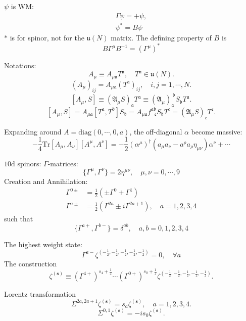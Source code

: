 $\psi$ is WM:
\begin{align}
	\Gamma \psi = + \psi,\\
	\psi^* = B \psi \label{Maj-cond}
\end{align}
$*$ is for spinor, not for the $\mathfrak{u}(N)$ matrix.
The defining property of $B$ is
\begin{equation}
	B \Gamma^\mu B^{-1} = (\Gamma^\mu)^*
\end{equation}

\begin{correct}
	Notations:
	\[
		A_\mu \equiv A_{\mu \mathfrak{a}} T^{\mathfrak{a}},\quad T^{\mathfrak{a}}\in \mathfrak{u}(N)
	.\] 
	\[
		(A_\mu)_{ij} =A_{\mu \mathfrak{a}} (T^{\mathfrak{a}})_{ij},\quad i,j=1,\cdots,N
	.\] 
	\[
		[A_\mu,S] \equiv (\mathfrak{A}_\mu S)_{\mathfrak{a}} T^{\mathfrak{a}}
		\equiv (\mathfrak{A}_\mu)_{\mathfrak{a}}^{~\mathfrak{b}} S_{\mathfrak{b}} T^{\mathfrak{a}}
	.\] 
	\[
		[A_\mu,S] = A_{\mu \mathfrak{a}} 
		[T^{\mathfrak{a}},T^{\mathfrak{b}}]S_{\mathfrak{b}}
		= A_{\mu \mathfrak{a}} f^{\mathfrak{a}\mathfrak{b}}_{~~~\mathfrak{c}}
		S_{\mathfrak{b}} T^{\mathfrak{c}}
		= (\mathfrak{A}_\mu S)_{\mathfrak{c}} T^{\mathfrak{c}}
	.\] 
\end{correct}

Expanding around $A = \mathrm{diag}(0,\cdots,0,a)$, the off-diagonal $\alpha$ become massive:
\begin{equation}
	-\frac{1}{4} \mathrm{Tr} [A_\mu,A_\nu][A^\mu,A^\nu]
	= - \frac{1}{2} (\alpha^\mu)^\dagger (a_\mu a_\nu - a^\rho a_\rho \eta_{\mu\nu}) \alpha^\nu+\cdots
\end{equation}

\begin{info}
	$10 \mathrm{d}$ spinors:
$\Gamma$-matrices:
\begin{equation}
    \{\Gamma^\mu,\Gamma^\nu\} = 2 \eta^{\mu\nu},\quad \mu,\nu = 0,\cdots,9
\end{equation}
Creation and Annihilation:
\begin{align*}
	\Gamma^{0\pm} &= \frac{1}{2} (\pm \Gamma^0 + \Gamma^1)\\
	\Gamma^{a\pm} &= \frac{1}{2} (\Gamma^{2a} \pm i \Gamma^{2a+1}),\quad
	a=1,2,3,4
\end{align*}
such that
\begin{equation*}
    \{\Gamma^{a+},\Gamma^{b-}\} = \delta^{ab},\quad a,b=0,1,2,3,4
\end{equation*}

The highest weight state:
\[
\Gamma^{a-} \zeta^{(-\frac{1}{2},-\frac{1}{2},-\frac{1}{2},-\frac{1}{2},-\frac{1}{2})} = 0,\quad
\forall a
\]
The construction
\[
	\zeta^{(\mathbf{s})} \equiv (\Gamma^{4+})^{s_4+\frac{1}{2}}
	\cdots(\Gamma^{0+})^{s_0 + \frac{1}{2}}
	\zeta^{(-\frac{1}{2},-\frac{1}{2},-\frac{1}{2},-\frac{1}{2},-\frac{1}{2})}
.\] 

Lorentz transformation
\[
	\Sigma^{2a,2a+1} \zeta^{(\mathbf{s})} = s_a \zeta^{(\mathbf{s})}
	,\quad a=1,2,3,4
.\] 
\[
	\Sigma^{0,1} \zeta^{(\mathbf{s})} = - i s_0 \zeta^{(\mathbf{s})}
.\] 
\end{info}

